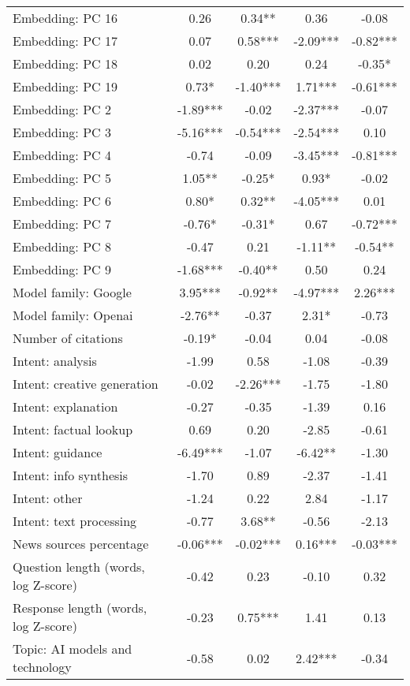 \begin{table}[htbp]
\begin{tabular}{p{4cm}cccc}
Embedding: PC 16 & 0.26 & 0.34** & 0.36 & -0.08 \\
Embedding: PC 17 & 0.07 & 0.58*** & -2.09*** & -0.82*** \\
Embedding: PC 18 & 0.02 & 0.20 & 0.24 & -0.35* \\
Embedding: PC 19 & 0.73* & -1.40*** & 1.71*** & -0.61*** \\
Embedding: PC 2 & -1.89*** & -0.02 & -2.37*** & -0.07 \\
Embedding: PC 3 & -5.16*** & -0.54*** & -2.54*** & 0.10 \\
Embedding: PC 4 & -0.74 & -0.09 & -3.45*** & -0.81*** \\
Embedding: PC 5 & 1.05** & -0.25* & 0.93* & -0.02 \\
Embedding: PC 6 & 0.80* & 0.32** & -4.05*** & 0.01 \\
Embedding: PC 7 & -0.76* & -0.31* & 0.67 & -0.72*** \\
Embedding: PC 8 & -0.47 & 0.21 & -1.11** & -0.54** \\
Embedding: PC 9 & -1.68*** & -0.40** & 0.50 & 0.24 \\
Model family: Google & 3.95*** & -0.92** & -4.97*** & 2.26*** \\
Model family: Openai & -2.76** & -0.37 & 2.31* & -0.73 \\
Number of citations & -0.19* & -0.04 & 0.04 & -0.08 \\
Intent: analysis & -1.99 & 0.58 & -1.08 & -0.39 \\
Intent: creative generation & -0.02 & -2.26*** & -1.75 & -1.80 \\
Intent: explanation & -0.27 & -0.35 & -1.39 & 0.16 \\
Intent: factual lookup & 0.69 & 0.20 & -2.85 & -0.61 \\
Intent: guidance & -6.49*** & -1.07 & -6.42** & -1.30 \\
Intent: info synthesis & -1.70 & 0.89 & -2.37 & -1.41 \\
Intent: other & -1.24 & 0.22 & 2.84 & -1.17 \\
Intent: text processing & -0.77 & 3.68** & -0.56 & -2.13 \\
News sources percentage & -0.06*** & -0.02*** & 0.16*** & -0.03*** \\
Question length (words, log Z-score) & -0.42 & 0.23 & -0.10 & 0.32 \\
Response length (words, log Z-score) & -0.23 & 0.75*** & 1.41 & 0.13 \\
Topic: AI models and technology & -0.58 & 0.02 & 2.42*** & -0.34 \\

\end{tabular}
\end{table}
